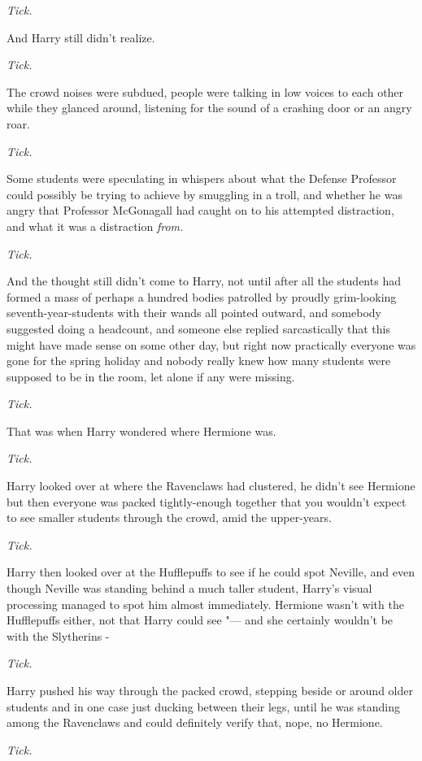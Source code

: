 \emph{Tick.}

And Harry still didn't realize.

\emph{Tick.}

The crowd noises were subdued, people were talking in low voices to each
other while they glanced around, listening for the sound of a crashing
door or an angry roar.

\emph{Tick.}

Some students were speculating in whispers about what the Defense
Professor could possibly be trying to achieve by smuggling in a troll,
and whether he was angry that Professor McGonagall had caught on to his
attempted distraction, and what it was a distraction \emph{from.}

\emph{Tick.}

And the thought still didn't come to Harry, not until after all the
students had formed a mass of perhaps a hundred bodies patrolled by
proudly grim-looking seventh-year-students with their wands all pointed
outward, and somebody suggested doing a headcount, and someone else
replied sarcastically that this might have made sense on some other day,
but right now practically everyone was gone for the spring holiday and
nobody really knew how many students were supposed to be in the room,
let alone if any were missing.

\emph{Tick.}

That was when Harry wondered where Hermione was.

\emph{Tick.}

Harry looked over at where the Ravenclaws had clustered, he didn't see
Hermione but then everyone was packed tightly-enough together that you
wouldn't expect to see smaller students through the crowd, amid the
upper-years.

\emph{Tick.}

Harry then looked over at the Hufflepuffs to see if he could spot
Neville, and even though Neville was standing behind a much taller
student, Harry's visual processing managed to spot him almost
immediately. Hermione wasn't with the Hufflepuffs either, not that Harry
could see "--- and she certainly wouldn't be with the Slytherins -

\emph{Tick.}

Harry pushed his way through the packed crowd, stepping beside or around
older students and in one case just ducking between their legs, until he
was standing among the Ravenclaws and could definitely verify that,
nope, no Hermione.

\emph{Tick.}

